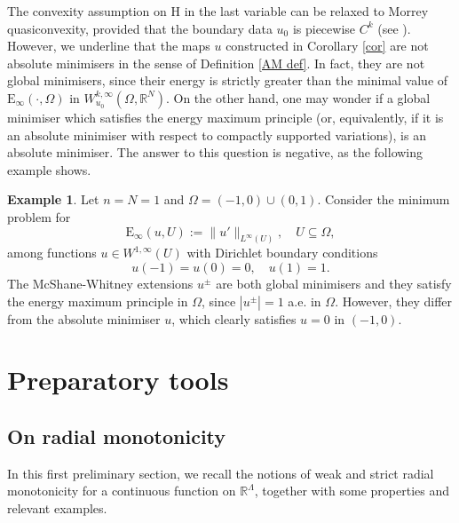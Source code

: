 \documentclass[a4paper,11pt]{article}
\numberwithin{equation}{section}
\newcommand{\numberset}{\mathbb}
\newcommand{\Om}{\Omega}
\newcommand{\R}{\numberset{R}}
\newcommand{\rom}{\mathrm}
\theoremstyle{definition}
\newtheorem{Example}[Theorem]{Example}
\begin{document}
The convexity assumption on $\rom H$ in the last variable can be relaxed to Morrey quasiconvexity, provided that the boundary data $u_0$ is piecewise $C^k$ (see \cite{K5}).
However, we underline that the maps $u$ constructed in Corollary \ref{cor} are not absolute minimisers in the sense of Definition \ref{AM def}. In fact, they are not global minimisers, since their energy is strictly greater than the minimal value of $\mathrm E_\infty(\cdot,\Om)$ in $W^{k,\infty}_{u_0}(\Om,\R^N)$. On the other hand, one may wonder if a global minimiser which satisfies the energy maximum principle (or, equivalently, if it is an absolute minimiser with respect to compactly supported variations), is an absolute minimiser. The answer to this question is negative, as the following example shows.

\begin{Example}
Let $n=N=1$ and $\Om=(-1,0)\cup(0,1)$. Consider the minimum problem for $$\mathrm E_\infty(u,U):=\|u'\|_{L^\infty(U)}, \quad U\subseteq\Om,$$ among functions $u\in W^{1,\infty}(U)$ with Dirichlet boundary conditions $$u(-1)=u(0)=0,\quad u(1)=1.$$
The McShane-Whitney extensions $u^{\pm}$ are both global minimisers and they satisfy the energy maximum principle in $\Om$, since $|u^\pm|=1$ a.e. in $\Om$. However, they differ from the absolute minimiser $u$, which clearly satisfies $u=0$ in $(-1,0)$. 
\end{Example}

















\section{Preparatory tools}\label{prep}


\subsection{On radial monotonicity}\label{radial mon}

In this first preliminary section, we recall the notions of weak and strict radial monotonicity for a continuous function on $\R^\Lambda$, together with some properties and relevant examples.
\end{document}
